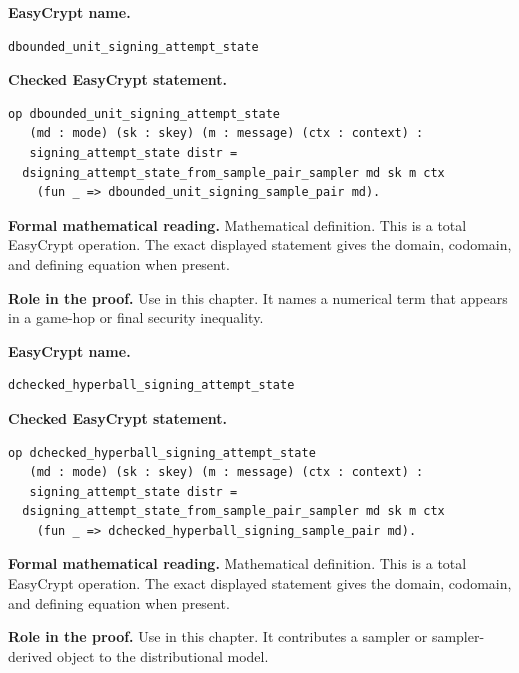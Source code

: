 \begin{formaldefinition}
\noindent\textbf{EasyCrypt name.}
\begin{lstlisting}[language=EasyCrypt,basicstyle=\ttfamily\scriptsize]
dbounded_unit_signing_attempt_state
\end{lstlisting}
\noindent\textbf{Checked EasyCrypt statement.}
\begin{lstlisting}[language=EasyCrypt,basicstyle=\ttfamily\scriptsize]
op dbounded_unit_signing_attempt_state
   (md : mode) (sk : skey) (m : message) (ctx : context) :
   signing_attempt_state distr =
  dsigning_attempt_state_from_sample_pair_sampler md sk m ctx
    (fun _ => dbounded_unit_signing_sample_pair md).
\end{lstlisting}
\noindent\textbf{Formal mathematical reading.}
Mathematical definition. This is a total EasyCrypt operation.  The exact displayed statement gives the domain, codomain, and defining equation when present.

\noindent\textbf{Role in the proof.}
Use in this chapter. It names a numerical term that appears in a game-hop or final security inequality.

\end{formaldefinition}

\begin{formaldefinition}
\noindent\textbf{EasyCrypt name.}
\begin{lstlisting}[language=EasyCrypt,basicstyle=\ttfamily\scriptsize]
dchecked_hyperball_signing_attempt_state
\end{lstlisting}
\noindent\textbf{Checked EasyCrypt statement.}
\begin{lstlisting}[language=EasyCrypt,basicstyle=\ttfamily\scriptsize]
op dchecked_hyperball_signing_attempt_state
   (md : mode) (sk : skey) (m : message) (ctx : context) :
   signing_attempt_state distr =
  dsigning_attempt_state_from_sample_pair_sampler md sk m ctx
    (fun _ => dchecked_hyperball_signing_sample_pair md).
\end{lstlisting}
\noindent\textbf{Formal mathematical reading.}
Mathematical definition. This is a total EasyCrypt operation.  The exact displayed statement gives the domain, codomain, and defining equation when present.

\noindent\textbf{Role in the proof.}
Use in this chapter. It contributes a sampler or sampler-derived object to the distributional model.

\end{formaldefinition}


